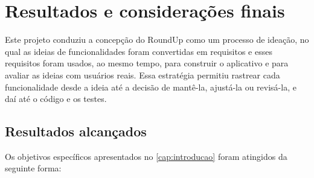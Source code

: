 
\chapter{Resultados e considerações finais}
\label{cap:resultados}

Este projeto conduziu a concepção do RoundUp como um processo de
ideação, no qual as ideias de funcionalidades foram convertidas em
requisitos e esses requisitos foram usados, ao mesmo tempo, para
construir o aplicativo e para avaliar as ideias com usuários reais. Essa estratégia permitiu rastrear cada
funcionalidade desde a ideia até a decisão de mantê-la, ajustá-la ou
revisá-la, e daí até o código e os testes.

\section{Resultados alcançados}

Os objetivos específicos apresentados no \autoref{cap:introducao} foram
atingidos da seguinte forma:

